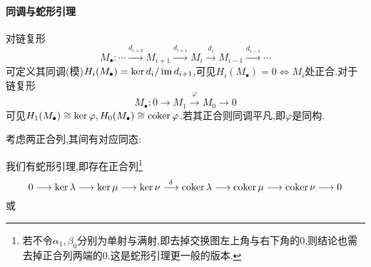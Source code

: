 \documentclass[11pt]{article} %
\begin{document}
\paragraph{同调与蛇形引理}
对链复形
$$M_{\bullet}:\cdots \overset{d_{i+2}}{\longrightarrow}M_{i+1}\overset{d_{i+1}}{\longrightarrow}M_{i}\overset{d_{i}}{\longrightarrow}M_{i-1}\overset{d_{i-1}}{\longrightarrow}\cdots$$
可定义其同调(模)$H_i(M_{\bullet})=\ker d_i/ \operatorname{im} d_{i+1}$,可见$H_i(M_{\bullet})=0\iff M_i$处正合.对于链复形
$$M_{\bullet}: 0\longrightarrow M_1 \overset{\varphi}{\longrightarrow} M_0 \longrightarrow 0$$
可见$H_1(M_{\bullet})\cong \ker\varphi, H_0(M_{\bullet})\cong \operatorname{coker}\varphi$.若其正合则同调平凡,即$\varphi$是同构.

考虑两正合列,其间有对应同态:
\begin{center}
\end{center}
我们有蛇形引理,即存在正合列\footnote{若不令$\alpha_1, \beta_0$分别为单射与满射,即去掉交换图左上角与右下角的0,则结论也需去掉正合列两端的0.这是蛇形引理更一般的版本.}
$$0\longrightarrow \ker\lambda \longrightarrow \ker\mu \longrightarrow \ker\nu \overset{\delta}{\longrightarrow} \operatorname{coker}\lambda \longrightarrow \operatorname{coker}\mu \longrightarrow \operatorname{coker}\nu \longrightarrow 0$$
或
\begin{center}
\end{center}
\end{document}
